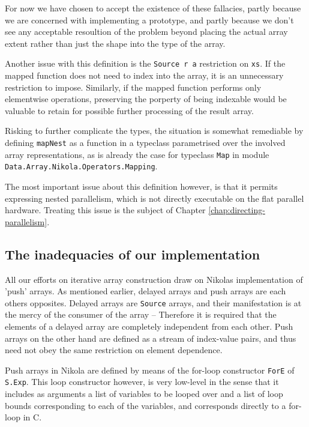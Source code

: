 For now we have chosen to accept the existence of these fallacies, partly
because we are concerned with implementing a prototype, and partly because we
don't see any acceptable resoultion of the problem beyond placing the actual
array extent rather than just the shape into the type of the array.

Another issue with this definition is the \texttt{Source r a} restriction on
\texttt{xs}. If the mapped function does not need to index into the array, it
is an unnecessary restriction to impose.  Similarly, if the mapped function
performs only elementwise operations, preserving the porperty of being
indexable would be valuable to retain for possible further processing of the
result array.

Risking to further complicate the types, the situation is somewhat remediable
by defining \texttt{mapNest} as a function in a typeclass parametrised over the
involved array representations, as is already the case for typeclass
\texttt{Map} in module \texttt{Data.Array.Nikola.Operators.Mapping}.

The most important issue about this definition however, is that it permits
expressing nested parallelism, which is not directly executable on the flat
parallel hardware. Treating this issue is the subject of Chapter
\ref{chap:directing-parallelism}.

\subsection{The inadequacies of our implementation}

All our efforts on iterative array construction draw on Nikolas implementation
of 'push' arrays. As mentioned earlier, delayed arrays and push arrays are each
others opposites. Delayed arrays are \texttt{Source} arrays, and their
manifestation is at the mercy of the consumer of the array -- Therefore it is
required that the elements of a delayed array are completely independent from
each other.  Push arrays on the other hand are defined as a stream of
index-value pairs, and thus need not obey the same restriction on element
dependence.

Push arrays in Nikola are defined by means of the for-loop constructor
\texttt{ForE} of \texttt{S.Exp}. This loop constructor however, is very
low-level in the sense that it includes as arguments a list of variables to be
looped over and a list of loop bounds corresponding to each of the variables,
and corresponds directly to a for-loop in C.

